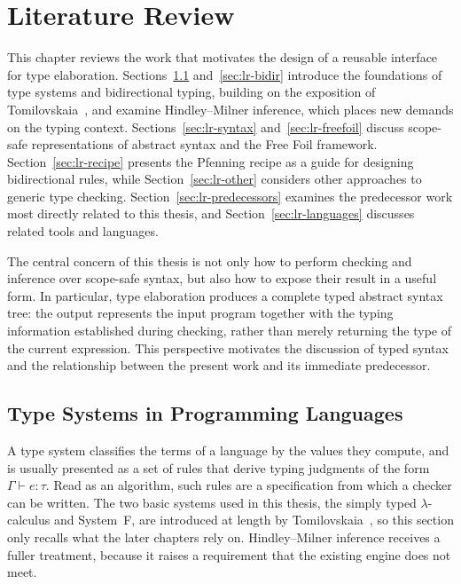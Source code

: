 \chapter{Literature Review}
\label{chap:lr}

This chapter reviews the work that motivates the design of a reusable interface for type elaboration. Sections~\ref{sec:lr-types} and~\ref{sec:lr-bidir} introduce the foundations of type systems and bidirectional typing, building on the exposition of Tomilovskaia~\cite{tomilovskaia2025bidir}, and examine Hindley--Milner inference, which places new demands on the typing context. Sections~\ref{sec:lr-syntax} and~\ref{sec:lr-freefoil} discuss scope-safe representations of abstract syntax and the Free Foil framework. Section~\ref{sec:lr-recipe} presents the Pfenning recipe as a guide for designing bidirectional rules, while Section~\ref{sec:lr-other} considers other approaches to generic type checking. Section~\ref{sec:lr-predecessors} examines the predecessor work most directly related to this thesis, and Section~\ref{sec:lr-languages} discusses related tools and languages.

The central concern of this thesis is not only how to perform checking and inference over scope-safe syntax, but also how to expose their result in a useful form. In particular, type elaboration produces a complete typed abstract syntax tree: the output represents the input program together with the typing information established during checking, rather than merely returning the type of the current expression. This perspective motivates the discussion of typed syntax and the relationship between the present work and its immediate predecessor.

\section{Type Systems in Programming Languages}
\label{sec:lr-types}

A type system classifies the terms of a language by the values they compute, and is usually presented as a set of rules that derive typing judgments of the form $\Gamma \vdash e : \tau$. Read as an algorithm, such rules are a specification from which a checker can be written. The two basic systems used in this thesis, the simply typed $\lambda$-calculus and System~F, are introduced at length by Tomilovskaia~\cite[Sec.~2.1]{tomilovskaia2025bidir}, so this section only recalls what the later chapters rely on. Hindley--Milner inference receives a fuller treatment, because it raises a requirement that the existing engine does not meet.

